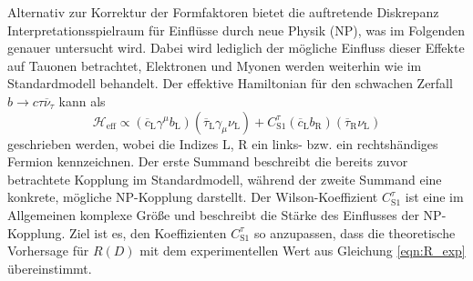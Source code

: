 Alternativ zur Korrektur der Formfaktoren bietet die auftretende Diskrepanz Interpretationsspielraum für Einflüsse durch neue Physik (NP), was im Folgenden genauer untersucht wird.
Dabei wird lediglich der mögliche Einfluss dieser Effekte auf Tauonen betrachtet, Elektronen und Myonen werden weiterhin wie im Standardmodell behandelt.
Der effektive Hamiltonian für den schwachen Zerfall $b \to c \tau \overline{\nu}_\tau$ kann als
\begin{equation}
  \mathcal{H}_\text{eff} \propto (\overline{c}_\text{L} \gamma^\mu b_\text{L})(\overline{\tau}_\text{L} \gamma_\mu \nu_\text{L} ) +  C_{\text{S}1}^\tau (\overline {c}_\text{L} b_\text{R}) (\overline{\tau}_\text{R} \nu_\text{L})
\end{equation}
geschrieben werden, wobei die Indizes $\text{L}$, $\text{R}$ ein links- bzw. ein rechtshändiges Fermion kennzeichnen.
Der erste Summand beschreibt die bereits zuvor betrachtete Kopplung im Standardmodell, während der zweite Summand eine konkrete, mögliche NP-Kopplung darstellt.
Der Wilson-Koeffizient $C_{\text{S}1}^\tau$ ist eine im Allgemeinen komplexe Größe und beschreibt die Stärke des Einflusses der NP-Kopplung.
Ziel ist es, den Koeffizienten $C_{\text{S}1}^\tau$ so anzupassen, dass die theoretische Vorhersage für $R(D)$ mit dem experimentellen Wert aus Gleichung \eqref{eqn:R_exp} übereinstimmt.

